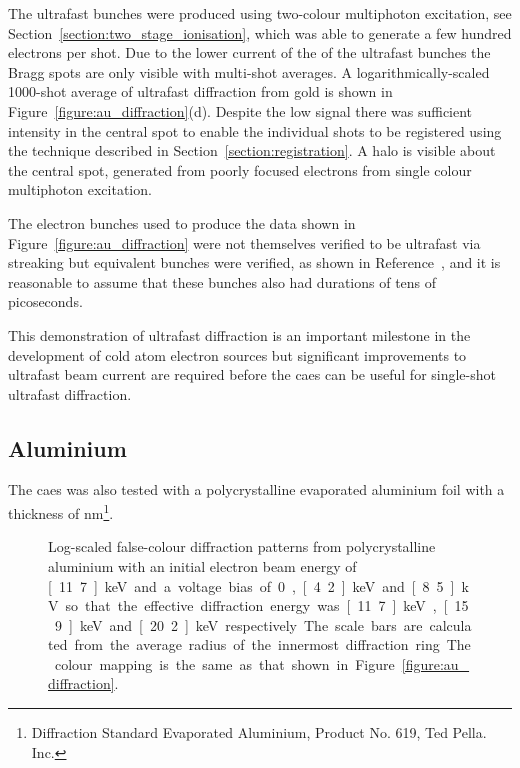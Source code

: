 The ultrafast bunches were produced using two-colour multiphoton excitation, see Section~\ref{section:two_stage_ionisation}, which was able to generate a few hundred electrons per shot.
Due to the lower current of the of the ultrafast bunches the Bragg spots are only visible with multi-shot averages.
A logarithmically-scaled 1000-shot average of ultrafast diffraction from gold is shown in Figure~\ref{figure:au_diffraction}(d).
Despite the low signal there was sufficient intensity in the central spot to enable the individual shots to be registered using the technique described in Section~\ref{section:registration}.
A halo is visible about the central spot, generated from poorly focused electrons from single colour multiphoton excitation.

The electron bunches used to produce the data shown in Figure~\ref{figure:au_diffraction} were not themselves verified to be ultrafast via streaking but equivalent bunches were verified, as shown in Reference~\cite{speirs_identification_2017}, and it is reasonable to assume that these bunches also had durations of tens of picoseconds.

This demonstration of ultrafast diffraction is an important milestone in the development of cold atom electron sources but significant improvements to ultrafast beam current are required before the \gls{caes} can be useful for single-shot ultrafast diffraction.

\subsection{Aluminium}\label{section:aluminium_diffraction}

The \gls{caes} was also tested with a polycrystalline evaporated aluminium foil with a thickness of \unit[31]{nm}\footnote{Diffraction Standard Evaporated Aluminium, Product No. 619, Ted Pella. Inc.}.

\begin{figure}
    \center
    
    \caption[Diffraction patterns from aluminium.]{Log-scaled false-colour diffraction patterns from polycrystalline aluminium with an initial electron beam energy of \unit[11.7]{keV} and a voltage bias of 0, \unit[4.2]{keV} and \unit[8.5]{kV} so that the effective diffraction energy was \unit[11.7]{keV}, \unit[15.9]{keV} and \unit[20.2]{keV} respectively. The scale bars are calculated from the average radius of the innermost diffraction ring. The colour mapping is the same as that shown in Figure~\ref{figure:au_diffraction}.}
    \label{figure:al_diffraction}
\end{figure}

